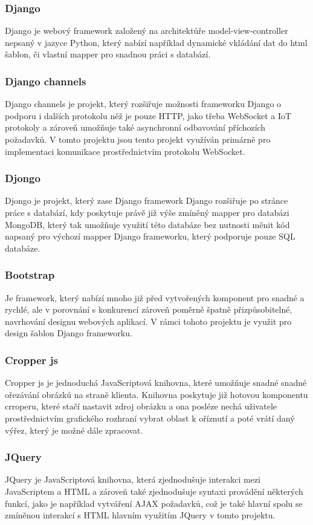\documentclass[12pt]{article}
\begin{document}
\subsubsection{Django}
Django je webový framework založený na architektůře model-view-controller nepsaný v jazyce Python, který nabízí například dynamické vkládání dat do html šablon, či vlastní mapper pro snadnou práci s databází. 
\subsubsection{Django channels}
Django channels je projekt, který rozšiřuje možnosti frameworku Django o podporu i dalších protokolu něž je pouze HTTP, jako třeba WebSocket a IoT protokoly a zároveň umožňuje také asynchronní odbavování příchozích požadavků\cite{channels}. V tomto projektu jsou tento projekt využíván primárně pro implementaci komunikace prostřednictvím protokolu WebSocket\cite{webSocket}.
\subsubsection{Djongo}
Djongo je projekt, který zase Django framework Django rozšiřuje po stránce práce s databází, kdy poskytuje právě již výše zmíněný mapper pro databázi MongoDB, který tak umožňuje využití této databáze bez nutnosti měnit kód napsaný pro výchozí mapper Django frameworku, který podporuje pouze SQL databáze\cite{djongo}.
\subsubsection{Bootstrap}
Je framework, který nabízí mnoho již před vytvořených komponent pro snadné a rychlé, ale v porovnání s konkurencí zároveň poměrně špatně přizpůsobitelné, navrhování designu webových aplikací\cite{bootstrap}. V rámci tohoto projektu je využit pro design šablon Django frameworku.
\subsubsection{Cropper js}
Cropper js je jednoduchá JavaScriptová knihovna, které umožňuje snadné snadné ořezávání obrázků na straně klienta\cite{cropperGit}. Knihovna poskytuje již hotovou komponentu crroperu, které stačí nastavit zdroj obrázku a ona posléze nechá uživatele prostřednictvím grafického rozhraní vybrat oblast k oříznutí a poté vrátí daný výřez, který je možné dále zpracovat\cite{cropperImp}.
\subsubsection{JQuery}
JQuery je JavaScriptová knihovna, která zjednodušuje interakci mezi JavaScriptem a HTML a zároveň také zjednodušuje syntaxi provádění některých funkcí, jako je například vytváření AJAX požadavků\cite{JQuery}, což je také hlavní spolu se zmíněnou interakcí s HTML hlavním využitím JQuery v tomto projektu.
\newpage
\end{document}
